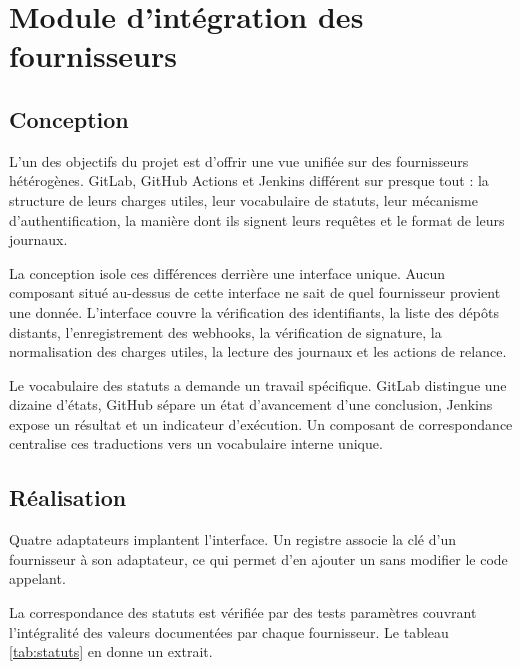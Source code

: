 \documentclass[12pt,a4paper,oneside]{report}
\begin{document}
\section{Module d'intégration des fournisseurs}

\subsection{Conception}

L'un des objectifs du projet est d'offrir une vue unifiée sur des fournisseurs
hétérogènes. GitLab, GitHub Actions et Jenkins différent sur presque tout : la
structure de leurs charges utiles, leur vocabulaire de statuts, leur mécanisme
d'authentification, la manière dont ils signent leurs requêtes et le format de
leurs journaux.

La conception isole ces différences derrière une interface unique. Aucun
composant situé au-dessus de cette interface ne sait de quel fournisseur provient
une donnée. L'interface couvre la vérification des identifiants, la liste des
dépôts distants, l'enregistrement des webhooks, la vérification de signature, la
normalisation des charges utiles, la lecture des journaux et les actions de
relance.

Le vocabulaire des statuts a demande un travail spécifique. GitLab distingue une
dizaine d'états, GitHub sépare un état d'avancement d'une conclusion, Jenkins
expose un résultat et un indicateur d'exécution. Un composant de correspondance
centralise ces traductions vers un vocabulaire interne unique.

\subsection{Réalisation}

Quatre adaptateurs implantent l'interface. Un registre associe la clé d'un
fournisseur à son adaptateur, ce qui permet d'en ajouter un sans modifier le
code appelant.

La correspondance des statuts est vérifiée par des tests paramètres couvrant
l'intégralité des valeurs documentées par chaque fournisseur. Le tableau
\ref{tab:statuts} en donne un extrait.
\end{document}
